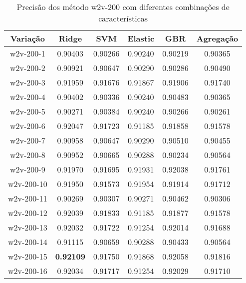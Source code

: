 \begin{table}[H]
\label{tab:precisionw2v200}
\centering
\begin{tabular}{|c| c c  c  c  c| }
\hline
Variação &  Ridge & SVM & Elastic & GBR & Agregação  \\ 
\hline
w2v-200-1 & 0.90403 & 0.90266 & 0.90240 & 0.90219 & 0.90365 \\
\hline
w2v-200-2 & 0.90921 & 0.90647 & 0.90290 & 0.90286 & 0.90490 \\
\hline
w2v-200-3 & 0.91959 & 0.91676 & 0.91867 & 0.91906 & 0.91740 \\
\hline
w2v-200-4 & 0.90402 & 0.90336 & 0.90240 & 0.90483 & 0.90365 \\
\hline
w2v-200-5 & 0.90271 & 0.90384 & 0.90240 & 0.90266 & 0.90261 \\
\hline
w2v-200-6 & 0.92047 & 0.91723 & 0.91185 & 0.91858 & 0.91578 \\
\hline
w2v-200-7 & 0.90958 & 0.90647 & 0.90290 & 0.90510 & 0.90455 \\
\hline
w2v-200-8 & 0.90952 & 0.90665 & 0.90288 & 0.90234 & 0.90564 \\
\hline
w2v-200-9 & 0.91970 & 0.91695 & 0.91931 & 0.92038 & 0.91761 \\
\hline
w2v-200-10 & 0.91950 & 0.91573 & 0.91954 & 0.91914 & 0.91712 \\
\hline
w2v-200-11 & 0.90269 & 0.90307 & 0.90271 & 0.90462 & 0.90306 \\
\hline
w2v-200-12 & 0.92039 & 0.91833 & 0.91185 & 0.91877 & 0.91578 \\
\hline
w2v-200-13 & 0.92032 & 0.91722 & 0.91254 & 0.92014 & 0.91688 \\
\hline
w2v-200-14 & 0.91115 & 0.90659 & 0.90288 & 0.90433 & 0.90564 \\
\hline
w2v-200-15 & \textbf{0.92109} & 0.91750 & 0.91868 & 0.92058 & 0.91816 \\
\hline
w2v-200-16 & 0.92034 & 0.91717 & 0.91254 & 0.92029 & 0.91710 \\
\hline
\end{tabular}
\caption{Precisão dos método w2v-200 com diferentes combinações de características}
\end{table}

